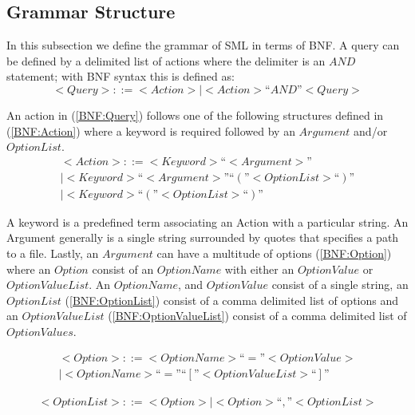 \documentclass[jair,twoside,11pt,theapa]{article}
\begin{document}
\subsection{Grammar Structure}
In this subsection we define the grammar of SML in terms of BNF. A query can be defined by a delimited list of actions where the delimiter is an \(AND\) statement; with BNF syntax this is defined as:
\begin{equation} \label{BNF:Query}
<Query> ::= <Action> | <Action> “AND” <Query>
\end{equation}

An action in (\ref{BNF:Query}) follows one of the following structures defined in (\ref{BNF:Action}) where a keyword is required followed by an \(Argument\) and/or \(OptionList\).
\begin{equation} \label{BNF:Action}
\begin{split}
<Action> ::= <Keyword> “<Argument>” \\
| <Keyword> “<Argument>” “(”<Option List>“)” \\
| <Keyword> “(”<Option List>“)”
\end{split}
\end{equation}

A keyword is a predefined term associating an Action with a particular string. An Argument generally is a single string surrounded by quotes that specifies a path to a file. Lastly, an \(Argument\) can have a multitude of options (\ref{BNF:Option}) where an \(Option\) consist of an \(OptionName\) with either an \(OptionValue\) or \(OptionValueList\). An \(OptionName\), and \(OptionValue\) consist of a single string, an \(OptionList\) (\ref{BNF:OptionList}) consist of a comma delimited list of options and an \(OptionValueList\) (\ref{BNF:OptionValueList}) consist of a comma delimited list of \(OptionValues\).

\begin{equation} \label{BNF:Option}
\begin{split}
<Option> ::= <Option Name> “=” <Option Value> \\
		| <Option Name> “=” “[”<Option Value List>“]”
\end{split}
\end{equation}

\begin{equation} \label{BNF:OptionList}
\begin{split}
	<Option List> ::= <Option> | <Option> “,” <Option List>
\end{split}
\end{equation}
\end{document}
